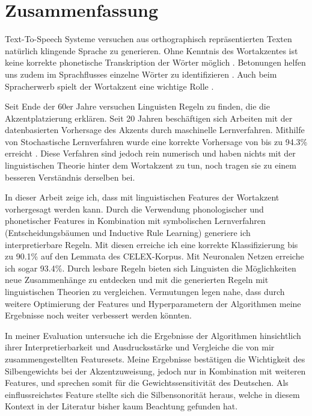 \section*{Zusammenfassung}


Text-To-Speech Systeme versuchen aus orthographisch repräsentierten Texten natürlich klingende Sprache zu generieren. Ohne Kenntnis des Wortakzentes ist keine korrekte phonetische Transkription der Wörter möglich \cite{???}. Betonungen helfen uns zudem im Sprachflusses einzelne Wörter zu identifizieren \cite{Curtin&Mintz&Christiansen2005}.
Auch beim Spracherwerb spielt der Wortakzent eine wichtige Rolle \cite{Brandelik2014}.

Seit Ende der 60er Jahre versuchen Linguisten Regeln zu finden, die die Akzentplatzierung erklären.
Seit 20 Jahren beschäftigen sich Arbeiten mit der datenbasierten Vorhersage des Akzents durch maschinelle Lernverfahren. Mithilfe von Stochastische Lernverfahren wurde eine korrekte Vorhersage von bis zu 94.3\% erreicht \cite{Dou&Bergsma2009}. Diese Verfahren sind jedoch rein numerisch und haben nichts mit der linguistischen Theorie hinter dem Wortakzent zu tun, noch tragen sie zu einem besseren Verständnis derselben bei.

In dieser Arbeit zeige ich, dass mit linguistischen Features der Wortakzent vorhergesagt werden kann. Durch die Verwendung phonologischer und phonetischer Features in Kombination mit symbolischen Lernverfahren (Entscheidungsbäumen und Inductive Rule Learning) generiere ich interpretierbare Regeln. Mit diesen erreiche ich eine korrekte Klassifizierung bis zu 90.1\% auf den Lemmata des CELEX-Korpus. Mit Neuronalen Netzen erreiche ich sogar 93.4\%. Durch lesbare Regeln bieten sich Linguisten die Möglichkeiten neue Zusammenhänge zu entdecken und mit die generierten Regeln mit linguistischen Theorien zu vergleichen. Vermutungen legen nahe, dass durch weitere Optimierung der Features und Hyperparametern der Algorithmen meine Ergebnisse noch weiter verbessert werden könnten.

In meiner Evaluation untersuche ich die Ergebnisse der Algorithmen hinsichtlich ihrer Interpretierbarkeit und Ausdrucksstärke und Vergleiche die von mir zusammengestellten Featuresets. 
Meine Ergebnisse bestätigen die Wichtigkeit des Silbengewichts bei der Akzentzuweisung, jedoch nur in Kombination mit weiteren Features, und sprechen somit für die Gewichtssensitivität des Deutschen. Als einflussreichstes Feature stellte sich die Silbensonorität heraus, welche in diesem Kontext in der Literatur bisher kaum Beachtung gefunden hat.
